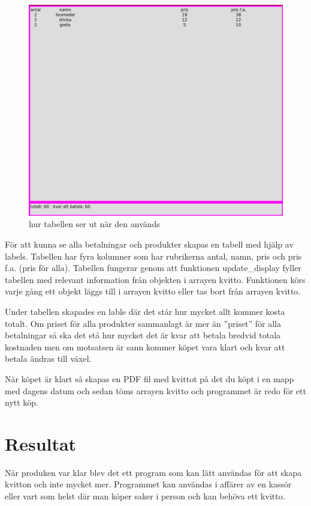\documentclass[a4paper, 12pt]{article}
\begin{document}
\begin{figure}[t!]
\centering
  \includegraphics[width=0.7\linewidth]{img/kvitto_disp.png}
  \caption{ hur tabellen ser ut när den används}
  \label{fig:kdisp}
\end{figure}

För att kunna se alla betalningar och produkter skapas en tabell med hjälp av labels. Tabellen har fyra kolumner som har rubrikerna antal, namn, pris och pris f.a. (pris för alla).
Tabellen fungerar genom att funktionen update\_display fyller tabellen med relevant information från objekten i arrayen kvitto. Funktionen körs varje gång ett objekt läggs till i arrayen kvitto eller tas bort från arrayen kvitto.


Under tabellen skapades en lable där det står hur mycket allt kommer kosta totalt. Om priset för alla produkter sammanlagt är mer än ''priset'' för alla betalningar så ska det stå hur mycket det är kvar att betala bredvid totala kostnaden men om motsatsen är sann kommer köpet vara klart och kvar att betala ändras till växel. 


När köpet är klart så skapas en PDF fil med kvittot på det du köpt i en mapp med dagens datum och sedan töms arrayen kvitto och programmet är redo för ett nytt köp.


\section{Resultat}

När produken var klar blev det ett program som kan lätt användas för att skapa kvitton och inte mycket mer.
Programmet kan användas i affärer av en kassör eller vart som helst där man köper saker i person och kan behöva ett kvitto.
\end{document}
